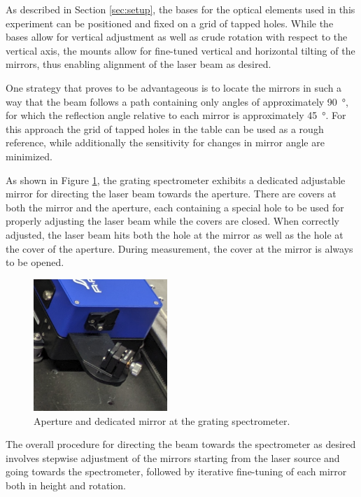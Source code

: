 As described in Section \ref{sec:setup}, the bases for the optical elements used in this experiment can be positioned and fixed on a grid of tapped holes. While the bases allow for vertical adjustment as well as crude rotation with respect to the vertical axis, the mounts allow for fine-tuned vertical and horizontal tilting of the mirrors, thus enabling alignment of the laser beam as desired.

One strategy that proves to be advantageous is to locate the mirrors in such a way that the beam follows a path containing only angles of approximately \SI{90}{\degree}, for which the reflection angle relative to each mirror is approximately \SI{45}{\degree}. For this approach the grid of tapped holes in the table can be used as a rough reference, while additionally the sensitivity for changes in mirror angle are minimized.

As shown in Figure \ref{fig:execution:aperture}, the grating spectrometer exhibits a dedicated adjustable mirror for directing the laser beam towards the aperture. There are covers at both the mirror and the aperture, each containing a special hole to be used for properly adjusting the laser beam while the covers are closed. When correctly adjusted, the laser beam hits both the hole at the mirror as well as the hole at the cover of the aperture. During measurement, the cover at the mirror is always to be opened.

\begin{figure}[H]
    \centering
    \includegraphics[width=0.45\textwidth]{graphics/aperture.png}
    \caption{Aperture and dedicated mirror at the grating spectrometer.}
    \label{fig:execution:aperture}
\end{figure}

The overall procedure for directing the beam towards the spectrometer as desired involves stepwise adjustment of the mirrors starting from the laser source and going towards the spectrometer, followed by iterative fine-tuning of each mirror both in height and rotation.

